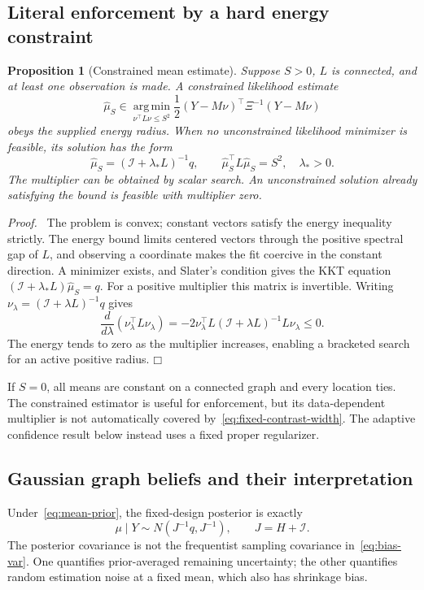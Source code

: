 \documentclass[11pt]{article}
\newtheorem{proposition}[theorem]{Proposition}
\newenvironment{proof}{\par\noindent\textit{Proof.}\ }{\hfill$\mdlgwhtsquare$\par\medskip}
\newcommand{\argmin}{\operatorname*{arg\,min}}
\begin{document}
\subsection{Literal enforcement by a hard energy constraint}
\begin{proposition}[Constrained mean estimate]
Suppose $S>0$, $L$ is connected, and at least one observation is made. A constrained likelihood estimate
\begin{equation}
\widehat\mu_S\in\argmin_{\nu^\top L\nu\le S^2}
\frac12(Y-M\nu)^\top\Xi^{-1}(Y-M\nu)
\label{eq:constrained}
\end{equation}
obeys the supplied energy radius. When no unconstrained likelihood minimizer is feasible, its solution has the form
\begin{equation}
\widehat\mu_S=(\mathcal I+\lambda_*L)^{-1}q,
\qquad \widehat\mu_S^\top L\widehat\mu_S=S^2,
\quad\lambda_*>0.
\end{equation}
The multiplier can be obtained by scalar search. An unconstrained solution already satisfying the bound is feasible with multiplier zero.
\end{proposition}
\begin{proof}
The problem is convex; constant vectors satisfy the energy inequality strictly. The energy bound limits centered vectors through the positive spectral gap of $L$, and observing a coordinate makes the fit coercive in the constant direction. A minimizer exists, and Slater's condition gives the KKT equation $(\mathcal I+\lambda_*L)\widehat\mu_S=q$. For a positive multiplier this matrix is invertible. Writing $\nu_\lambda=(\mathcal I+\lambda L)^{-1}q$ gives
\[
\frac{d}{d\lambda}(\nu_\lambda^\top L\nu_\lambda)
=-2\nu_\lambda^\top L(\mathcal I+\lambda L)^{-1}L\nu_\lambda\le0.
\]
The energy tends to zero as the multiplier increases, enabling a bracketed search for an active positive radius.
\end{proof}
If $S=0$, all means are constant on a connected graph and every location ties. The constrained estimator is useful for enforcement, but its data-dependent multiplier is not automatically covered by~\eqref{eq:fixed-contrast-width}. The adaptive confidence result below instead uses a fixed proper regularizer.

\subsection{Gaussian graph beliefs and their interpretation}
Under~\eqref{eq:mean-prior}, the fixed-design posterior is exactly
\begin{equation}
\mu\mid Y\sim N(J^{-1}q,J^{-1}),\qquad J=H+\mathcal I.
\label{eq:posterior}
\end{equation}
The posterior covariance is not the frequentist sampling covariance in~\eqref{eq:bias-var}. One quantifies prior-averaged remaining uncertainty; the other quantifies random estimation noise at a fixed mean, which also has shrinkage bias.
\end{document}
